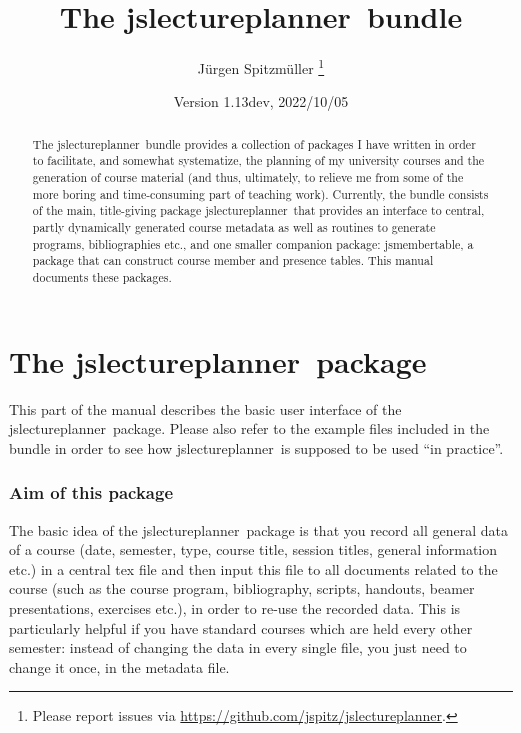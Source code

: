 \documentclass[english]{article}
\newcommand*\jslp{\textsf{jslectureplanner}}
\newcommand*\jsmt{\textsf{jsmembertable}}
\begin{document}
\title{The \jslp\ bundle}

\author{Jürgen Spitzmüller%
\thanks{Please report issues via \protect\url{https://github.com/jspitz/jslectureplanner}.}}

\date{Version 1.13dev, 2022/10/05}

\maketitle

\begin{abstract}
\noindent The \jslp\ bundle provides a collection of packages
I have written in order to facilitate, and somewhat systematize,
the planning of my university courses and the generation of course material
(and thus, ultimately, to relieve me from some of the more boring and
time-consuming part of teaching work).
Currently, the bundle consists of the main, title-giving package \jslp\
that provides an interface to central, partly dynamically generated course
metadata as well as routines to generate programs, bibliographies etc., and one
smaller companion package: \jsmt, a package that can construct course
member and presence tables. This manual documents these packages.
\end{abstract}

\tableofcontents

\clearpage

\part{The \jslp\ package}

This part of the manual describes the basic user interface of the
\jslp\ package.
Please also refer to the example files included in the bundle in order to
see how \jslp\ is supposed to be used ``in practice''.

\section{Aim of this package}

The basic idea of the \jslp\ package is that you record
all general data of a course (date, semester, type, course title, session titles,
general information etc.) in a central tex file and then input this
file to all documents related to the course (such as the course program,
bibliography, scripts, handouts, beamer presentations, exercises etc.),
in order to re-use the recorded data.
This is particularly helpful if you have standard courses which
are held every other semester: instead of changing the data in every
single file, you just need to change it once, in the metadata file.
\end{document}
